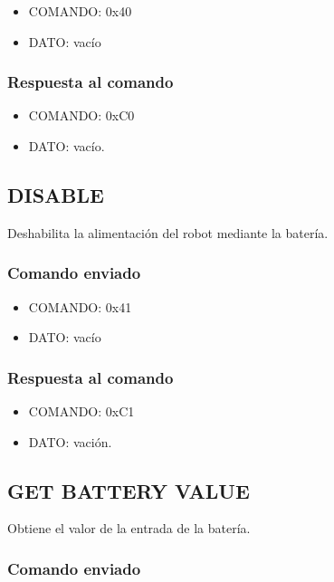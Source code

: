 \documentclass[a4paper,10pt]{article}
\begin{document}
\begin{itemize}
	\item{COMANDO:} 0x40
	\item{DATO:} vac\'io
\end{itemize}

\subsubsection*{Respuesta al comando}

\begin{itemize}
	\item{COMANDO:} 0xC0
	\item{DATO:} vac\'io.

\end{itemize}

\subsection{DISABLE}
\label{get_battery_value}

Deshabilita la alimentaci\'on del robot mediante la bater\'ia.

\subsubsection*{Comando enviado}

\begin{itemize}
	\item{COMANDO:} 0x41
	\item{DATO:} vac\'io
\end{itemize}

\subsubsection*{Respuesta al comando}

\begin{itemize}
	\item{COMANDO:} 0xC1
	\item{DATO:} vaci\'on.

\end{itemize}

\subsection{GET BATTERY VALUE}
\label{get_battery_value}

Obtiene el valor de la entrada de la bater\'ia.

\subsubsection*{Comando enviado}
\end{document}
